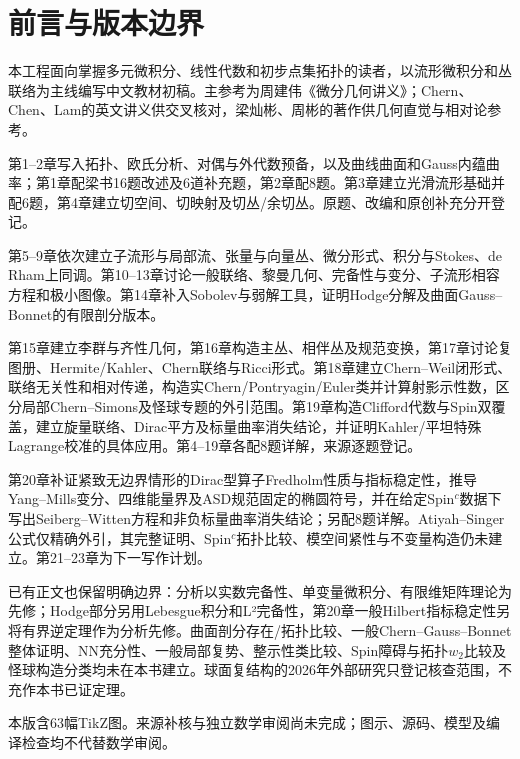 \chapter*{前言与版本边界}
本工程面向掌握多元微积分、线性代数和初步点集拓扑的读者，以流形微积分和丛联络为主线编写中文教材初稿。主参考为周建伟《微分几何讲义》；Chern、Chen、Lam的英文讲义供交叉核对，梁灿彬、周彬的著作供几何直觉与相对论参考。

第1--2章写入拓扑、欧氏分析、对偶与外代数预备，以及曲线曲面和Gauss内蕴曲率；第1章配梁书16题改述及6道补充题，第2章配8题。第3章建立光滑流形基础并配6题，第4章建立切空间、切映射及切丛/余切丛。原题、改编和原创补充分开登记。

第5--9章依次建立子流形与局部流、张量与向量丛、微分形式、积分与Stokes、de Rham上同调。第10--13章讨论一般联络、黎曼几何、完备性与变分、子流形相容方程和极小图像。第14章补入Sobolev与弱解工具，证明Hodge分解及曲面Gauss--Bonnet的有限剖分版本。

第15章建立李群与齐性几何，第16章构造主丛、相伴丛及规范变换，第17章讨论复图册、Hermite/Kahler、Chern联络与Ricci形式。第18章建立Chern--Weil闭形式、联络无关性和相对传递，构造实Chern/Pontryagin/Euler类并计算射影示性数，区分局部Chern--Simons及怪球专题的外引范围。第19章构造Clifford代数与Spin双覆盖，建立旋量联络、Dirac平方及标量曲率消失结论，并证明Kahler/平坦特殊Lagrange校准的具体应用。第4--19章各配8题详解，来源逐题登记。

第20章补证紧致无边界情形的Dirac型算子Fredholm性质与指标稳定性，推导Yang--Mills变分、四维能量界及ASD规范固定的椭圆符号，并在给定Spin$^c$数据下写出Seiberg--Witten方程和非负标量曲率消失结论；另配8题详解。Atiyah--Singer公式仅精确外引，其完整证明、Spin$^c$拓扑比较、模空间紧性与不变量构造仍未建立。第21--23章为下一写作计划。

已有正文也保留明确边界：分析以实数完备性、单变量微积分、有限维矩阵理论为先修；Hodge部分另用Lebesgue积分和L²完备性，第20章一般Hilbert指标稳定性另将有界逆定理作为分析先修。曲面剖分存在/拓扑比较、一般Chern--Gauss--Bonnet整体证明、NN充分性、一般局部复势、整示性类比较、Spin障碍与拓扑$w_2$比较及怪球构造分类均未在本书建立。球面复结构的2026年外部研究只登记核查范围，不充作本书已证定理。

本版含63幅TikZ图。来源补核与独立数学审阅尚未完成；图示、源码、模型及编译检查均不代替数学审阅。
